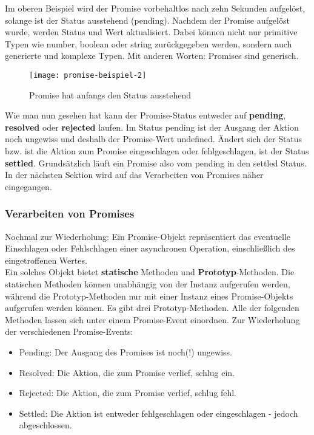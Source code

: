 \noindent
Im oberen Beispiel wird der Promise vorbehaltlos nach zehn Sekunden aufgelöst, solange ist der Status ausstehend (pending). Nachdem der Promise aufgelöst wurde, werden Status und Wert aktualisiert. Dabei können nicht nur primitive Typen wie number, boolean oder string zurückgegeben werden, sondern auch generierte und komplexe Typen. Mit anderen Worten: Promises sind generisch.

\begin{figure}[H]
\centering
\texttt{[image: promise-beispiel-2]}
\caption{Promise hat anfangs den Status \glqq{}ausstehend\grqq{}}
\end{figure}

\noindent
Wie man nun gesehen hat kann der Promise-Status entweder auf \textbf{pending}, \textbf{resolved} oder \textbf{rejected} laufen. Im Status pending ist der Ausgang der Aktion noch ungewiss und deshalb der Promise-Wert undefined. Ändert sich der Status bzw. ist die Aktion zum Promise eingeschlagen oder fehlgeschlagen, ist der Status \textbf{settled}. Grundsätzlich läuft ein Promise also vom pending in den settled Status. In der nächsten Sektion wird auf das Verarbeiten von Promises näher eingegangen.

\subsubsection{Verarbeiten von Promises}

Nochmal zur Wiederholung: Ein Promise-Objekt repräsentiert das eventuelle Einschlagen oder Fehlschlagen einer asynchronen Operation, einschließlich des eingetroffenen Wertes. \\

\noindent
Ein solches Objekt bietet \textbf{statische} Methoden und \textbf{Prototyp}-Methoden. Die statischen Methoden können unabhängig von der Instanz aufgerufen werden, während die Prototyp-Methoden nur mit einer Instanz eines Promise-Objekts aufgerufen werden können. Es gibt drei Prototyp-Methoden. Alle der folgenden Methoden lassen sich unter einem Promise-Event einordnen.
Zur Wiederholung der verschiedenen Promise-Events:

\begin{itemize} 
\item Pending: Der Ausgang des Promises ist noch(!) ungewiss.
\item Resolved: Die Aktion, die zum Promise verlief, schlug ein.
\item Rejected: Die Aktion, die zum Promise verlief, schlug fehl.
\item Settled: Die Aktion ist entweder fehlgeschlagen oder eingeschlagen - jedoch abgeschlossen.
\end{itemize}

